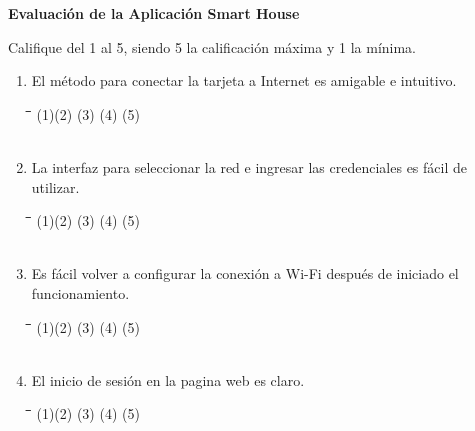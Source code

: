 \documentclass[]{proc}
\begin{document}
	
\textbf{Evaluación de la Aplicación Smart House\\}

Califique del 1 al 5, siendo 5 la calificación máxima y 1 la mínima.\\

\begin{enumerate}
	\item El método para conectar la tarjeta a Internet es amigable e intuitivo.
	
	\begin{tabbing}
		\hspace{1cm}\=\hspace{1cm}\=\hspace{1cm}\=\hspace{1cm}\=\kill
		(1)\>(2)  \>(3)  \>(4)  \>(5)\\\\
	\end{tabbing}
	
	\item La interfaz para seleccionar la red e ingresar las credenciales es fácil de utilizar. 
	
	\begin{tabbing}
		\hspace{1cm}\=\hspace{1cm}\=\hspace{1cm}\=\hspace{1cm}\=\kill
		(1)\>(2)  \>(3)  \>(4)  \>(5) \\\\
	\end{tabbing} 
	
	\item Es fácil volver a configurar la conexión a Wi-Fi después de iniciado el funcionamiento.
	
	\begin{tabbing}
		\hspace{1cm}\=\hspace{1cm}\=\hspace{1cm}\=\hspace{1cm}\=\kill
		(1)\>(2)  \>(3)  \>(4)  \>(5) \\\\
	\end{tabbing} 
	
	\item El inicio de sesión en la pagina web es claro.
	
	\begin{tabbing}
		\hspace{1cm}\=\hspace{1cm}\=\hspace{1cm}\=\hspace{1cm}\=\kill
		(1)\>(2)  \>(3)  \>(4)  \>(5) \\\\
	\end{tabbing} 
	

\end{enumerate}
\end{document}
